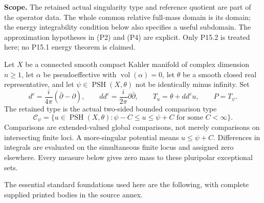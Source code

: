 \documentclass[
  11pt,
]{article}
\begin{document}
\textbf{Scope.} The retained actual singularity type and reference
quotient are part of the operator data. The whole common relative
full-mass domain is its domain; the energy integrability condition below
also specifies a useful subdomain. The approximation hypotheses in
(P2) and (P4) are explicit. Only P15.2 is treated here; no P15.1 energy
theorem is claimed.

Let \(X\) be a connected smooth compact Kahler manifold of complex
dimension \(n\geq1\), let \(\alpha\) be pseudoeffective with
\(\operatorname{vol}(\alpha)=0\), let \(\theta\) be a smooth closed real
representative, and let \(\psi\in\operatorname{PSH}(X,\theta)\) not be
identically minus infinity. Set \[
d^c=\frac{i}{4\pi}(\bar\partial-\partial),\qquad dd^c=\frac{i}{2\pi}\partial\bar\partial,
\qquad T_u=\theta+dd^cu,\qquad P=T_\psi.
\] The retained type is the actual two-sided bounded comparison type \[
\mathcal C_\psi=\{u\in\operatorname{PSH}(X,\theta):\psi-C\leq u\leq\psi+C\text{ for some }C<\infty\}.
\] Comparisons are extended-valued global comparisons, not merely
comparisons on intersecting finite loci. A more-singular potential means
\(u\leq\psi+C\). Differences in integrals are evaluated on the
simultaneous finite locus and assigned zero elsewhere. Every measure
below gives zero mass to these pluripolar exceptional sets.

The essential standard foundations used here are the following, with
complete supplied printed bodies in the source annex.
\end{document}
